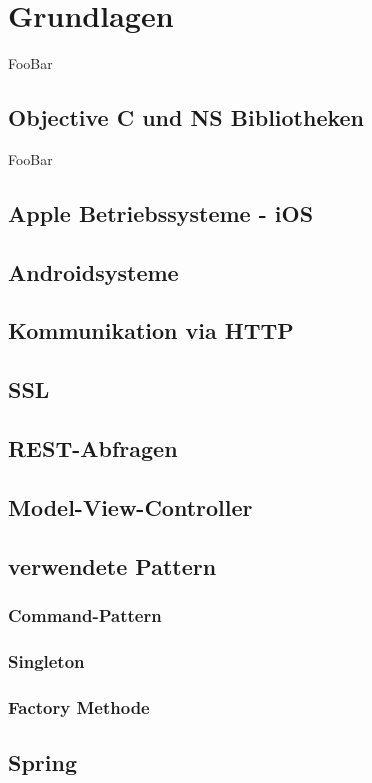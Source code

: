 \chapter{Grundlagen}
FooBar\\
\section{Objective C und NS Bibliotheken}
FooBar\\
\section{Apple Betriebssysteme - iOS}
\section{Androidsysteme}
\section{Kommunikation via HTTP}
\section{SSL}
\section{REST-Abfragen}
\section{Model-View-Controller}
\section{verwendete Pattern}
\subsection{Command-Pattern}
\subsection{Singleton}
\subsection{Factory Methode}
\section{Spring}